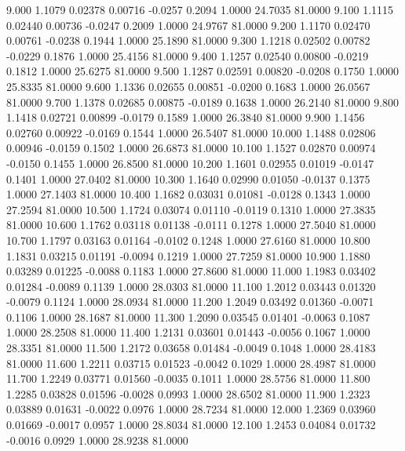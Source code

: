    9.000   1.1079   0.02378   0.00716  -0.0257   0.2094   1.0000  24.7035  81.0000
   9.100   1.1115   0.02440   0.00736  -0.0247   0.2009   1.0000  24.9767  81.0000
   9.200   1.1170   0.02470   0.00761  -0.0238   0.1944   1.0000  25.1890  81.0000
   9.300   1.1218   0.02502   0.00782  -0.0229   0.1876   1.0000  25.4156  81.0000
   9.400   1.1257   0.02540   0.00800  -0.0219   0.1812   1.0000  25.6275  81.0000
   9.500   1.1287   0.02591   0.00820  -0.0208   0.1750   1.0000  25.8335  81.0000
   9.600   1.1336   0.02655   0.00851  -0.0200   0.1683   1.0000  26.0567  81.0000
   9.700   1.1378   0.02685   0.00875  -0.0189   0.1638   1.0000  26.2140  81.0000
   9.800   1.1418   0.02721   0.00899  -0.0179   0.1589   1.0000  26.3840  81.0000
   9.900   1.1456   0.02760   0.00922  -0.0169   0.1544   1.0000  26.5407  81.0000
  10.000   1.1488   0.02806   0.00946  -0.0159   0.1502   1.0000  26.6873  81.0000
  10.100   1.1527   0.02870   0.00974  -0.0150   0.1455   1.0000  26.8500  81.0000
  10.200   1.1601   0.02955   0.01019  -0.0147   0.1401   1.0000  27.0402  81.0000
  10.300   1.1640   0.02990   0.01050  -0.0137   0.1375   1.0000  27.1403  81.0000
  10.400   1.1682   0.03031   0.01081  -0.0128   0.1343   1.0000  27.2594  81.0000
  10.500   1.1724   0.03074   0.01110  -0.0119   0.1310   1.0000  27.3835  81.0000
  10.600   1.1762   0.03118   0.01138  -0.0111   0.1278   1.0000  27.5040  81.0000
  10.700   1.1797   0.03163   0.01164  -0.0102   0.1248   1.0000  27.6160  81.0000
  10.800   1.1831   0.03215   0.01191  -0.0094   0.1219   1.0000  27.7259  81.0000
  10.900   1.1880   0.03289   0.01225  -0.0088   0.1183   1.0000  27.8600  81.0000
  11.000   1.1983   0.03402   0.01284  -0.0089   0.1139   1.0000  28.0303  81.0000
  11.100   1.2012   0.03443   0.01320  -0.0079   0.1124   1.0000  28.0934  81.0000
  11.200   1.2049   0.03492   0.01360  -0.0071   0.1106   1.0000  28.1687  81.0000
  11.300   1.2090   0.03545   0.01401  -0.0063   0.1087   1.0000  28.2508  81.0000
  11.400   1.2131   0.03601   0.01443  -0.0056   0.1067   1.0000  28.3351  81.0000
  11.500   1.2172   0.03658   0.01484  -0.0049   0.1048   1.0000  28.4183  81.0000
  11.600   1.2211   0.03715   0.01523  -0.0042   0.1029   1.0000  28.4987  81.0000
  11.700   1.2249   0.03771   0.01560  -0.0035   0.1011   1.0000  28.5756  81.0000
  11.800   1.2285   0.03828   0.01596  -0.0028   0.0993   1.0000  28.6502  81.0000
  11.900   1.2323   0.03889   0.01631  -0.0022   0.0976   1.0000  28.7234  81.0000
  12.000   1.2369   0.03960   0.01669  -0.0017   0.0957   1.0000  28.8034  81.0000
  12.100   1.2453   0.04084   0.01732  -0.0016   0.0929   1.0000  28.9238  81.0000
